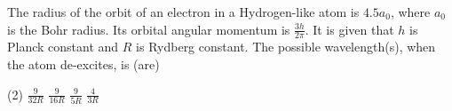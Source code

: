 
\item The radius of the orbit of an electron in a Hydrogen-like atom is \(4.5 a_0\), where \(a_0\) is the Bohr radius. Its orbital angular momentum is \(\frac{3h}{2\pi}\). It is given that \(h\) is Planck constant and \(R\) is Rydberg constant. The possible wavelength(s), when the atom de-excites, is (are)
    \begin{tasks}(2)
        \task \(\frac{9}{32R}\)
        \task \(\frac{9}{16R}\)
        \task \(\frac{9}{5R}\)
        \task \(\frac{4}{3R}\)
    \end{tasks}
